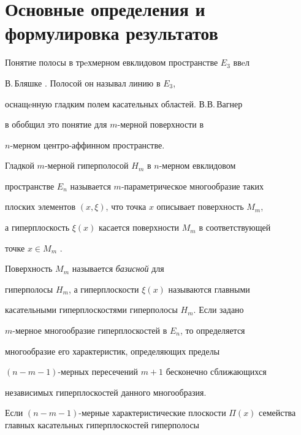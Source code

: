 \section{Основные определения и формулировка результатов}





Понятие полосы в трeхмерном евклидовом пространстве $E_3$ ввeл


В.\,Бляшке \cite{chak1}. Полосой он называл линию в $E_3$,


оснащeнную гладким полем касательных областей. В.В.\,Вагнер


в \cite{chak2} обобщил это понятие для $m$-мерной поверхности в


$n$-мерном центро-аффинном пространстве.





\begin{defn}


Гладкой $m$-мерной гиперполосой $H_m$ в $n$-мерном евклидовом 


пространстве $E_n$ называется $m$-параметрическое многообразие таких 


плоских элементов $(x, \xi)$, что точка $x$ описывает поверхность $M_m$, 


а гиперплоскость $\xi(x)$ касается поверхности $M_m$ в соответствующей 


точке $x\in M_m$ \cite{chak2}.


\end{defn}





Поверхность $M_m$ называется {\it базисной} для


гиперполосы $H_m$, а гиперплоскости $\xi(x)$ называются главными


касательными гиперплоскостями гиперполосы $H_m$. Если задано


$m$-мерное многообразие гиперплоскостей в $E_n$, то определяется


многообразие его характеристик, определяющих пределы


$(n-m-1)$-мерных пересечений $m+1$ бесконечно сближающихся


независимых гиперплоскостей данного многообразия.





Если $(n-m-1)$-мерные характеристические плоскости $\Pi


(x)$ семейства главных касательных гиперплоскостей гиперполосы


